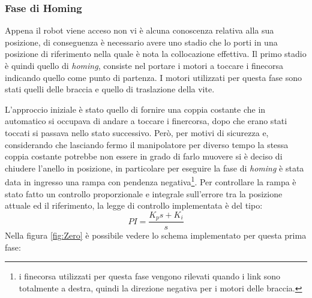 \subsubsection{Fase di Homing}
Appena il robot viene acceso non vi è alcuna conoscenza relativa alla sua posizione, di conseguenza è necessario avere uno stadio che lo porti in una posizione di riferimento nella quale è nota la collocazione effettiva. Il primo stadio è quindi quello di \textit{homing}, consiste nel portare i motori a toccare i finecorsa indicando quello come punto di partenza. I motori utilizzati per questa fase sono stati quelli delle braccia e quello di traslazione della vite.
\par L'approccio iniziale è stato quello di fornire una coppia costante che in automatico si occupava di andare a toccare i finercorsa, dopo che erano stati toccati si passava nello stato successivo. Però, per motivi di sicurezza e, considerando che lasciando fermo il manipolatore per diverso tempo la stessa coppia costante potrebbe non essere in grado di farlo muovere si è deciso di chiudere l'anello in posizione, in particolare per eseguire la fase di \textit{homing} è stata data in ingresso una rampa con pendenza negativa\footnote{i finecorsa utilizzati per questa fase vengono rilevati quando i link sono totalmente a destra, quindi la direzione negativa per i motori delle braccia.}.
Per controllare la rampa è stato fatto un controllo proporzionale e integrale sull'errore tra la posizione attuale ed il riferimento, la legge di controllo implementata è del tipo:
\begin{equation*}
	PI = \frac{K_p s + K_i}{s}
\end{equation*}
Nella figura \ref{fig:Zero} è possibile vedere lo schema implementato per questa prima fase:
